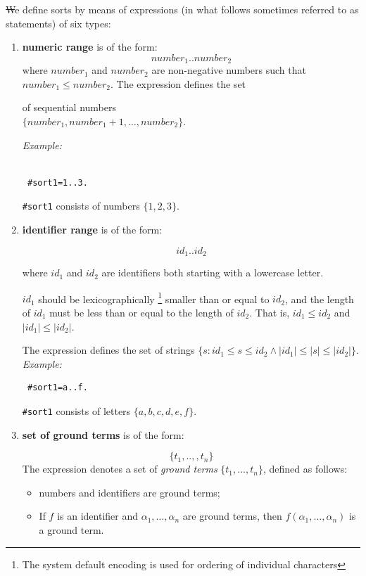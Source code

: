 \documentclass[12pt, letterpaper]{article}
\begin{document}
\st We define sorts by means of expressions (in what follows sometimes referred to as statements) of six types:
\begin{enumerate}


\item
\textbf{numeric range} is of the form:
\begin{equation*}
number_1..number_2
\end{equation*}
where $number_1$ and $number_2$ are non-negative numbers such that $number_1 \le number_2$. The expression defines the set 

of sequential numbers \\$\{number_1, number_1+1, \dots, number_2\}$.



\textit{Example:}



\begin{verbatim}

 #sort1=1..3.

\end{verbatim}

\texttt{\#sort1} consists of numbers $\{1,2,3\}$.


\item \textbf{identifier range} is of the form:

\begin{equation*}
  id_1..id_2
\end{equation*}

where $id_1$ and $id_2$ are identifiers both starting with a lowercase letter.

$id_1$ should be lexicographically \footnote{ The system default encoding is used for  ordering of individual characters} smaller than or equal to  $id_2$, and the length of $id_1$ must be less than or equal to the length of $id_2$. That is,  $id_1 \leq id_2$ and $|id_1| \leq |id_2|$.

The expression defines the set of strings  $\{s: id_1\leq s \leq id_2 \land |id_1|\leq |s| \leq |id_2|\}$.
\textit{Example:}

\begin{verbatim}
 #sort1=a..f.
\end{verbatim}

\texttt{\#sort1} consists of letters $\{a,b,c,d,e,f\}$.

\item \textbf{set of ground terms} is of the form:

\begin{equation*}
\{t_1,..,,t_n\}
\end{equation*}
The expression denotes a set of \textit{ground terms} $\{t_1,...,t_n\}$, defined as follows:
\begin{itemize}
 \item numbers and identifiers are ground terms;
 \item If $f$ is an identifier and $\alpha_1, \dots, \alpha_n$ are ground terms, 
then $f(\alpha_1,\dots, \alpha_n)$ is a ground term.
\end{itemize}


\end{enumerate}
\end{document}
